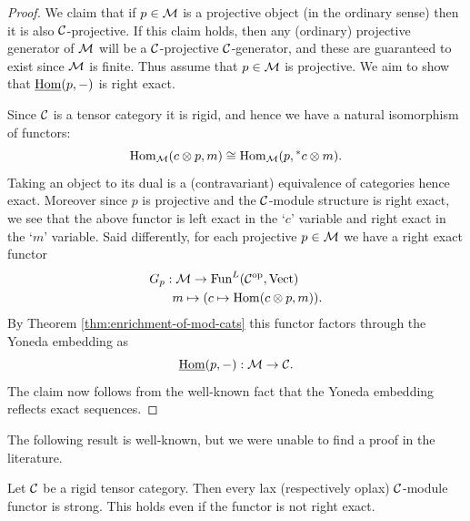 \documentclass{amsart}
\begin{document}
\begin{proof}
	We claim that if $p \in \mathcal M$ is a projective object (in the ordinary sense) then it is also $\mathcal C$-projective. If this claim holds, then any (ordinary) projective generator of $\mathcal M$ will be a $\mathcal C$-projective $\mathcal C$-generator, and these are guaranteed to exist since $\mathcal M$ is finite. Thus assume that $p \in \mathcal M$ is projective.  We aim to show that $\operatorname{\underline{Hom}}(p, -)$ is right exact. 
	
	Since $\mathcal C$ is a tensor category it is rigid, and hence we have a natural isomorphism of functors:
\begin{equation*}
	\operatorname{Hom}_{\mathcal M}(c \otimes p, m) \cong \operatorname{Hom}_{\mathcal M}(p, {}^*c \otimes m).
\end{equation*}
Taking an object to its dual is a (contravariant) equivalence of categories hence exact. Moreover since $p$ is projective and the $\mathcal C$-module structure is right exact, we see that the above functor is left exact in the `$c$' variable and right exact in the `$m$' variable. Said differently, for each projective $p \in \mathcal M$ we have a right exact functor
\begin{align*}
	G_p: & \; \mathcal M \to \operatorname{Fun}^L(\mathcal C^{\mathrm{op}}, \mathrm{Vect}) \\
	& m \mapsto (c \mapsto \operatorname{Hom}(c \otimes p, m)).
\end{align*}
By Theorem \ref{thm:enrichment-of-mod-cats} this functor factors through the Yoneda embedding as
\begin{equation*}
	\operatorname{\underline{Hom}}(p, -): \mathcal M \to \mathcal C.
\end{equation*}
The claim now follows from the well-known fact that the Yoneda embedding reflects exact sequences. 
\end{proof}


The following result is well-known, but we were unable to find a proof in the literature.

\begin{lemma} 
	Let $\mathcal C$ be a rigid tensor category. Then every lax (respectively oplax) $\mathcal C$-module functor is strong. This holds even if the functor is not right exact.   
\end{lemma}
\end{document}
